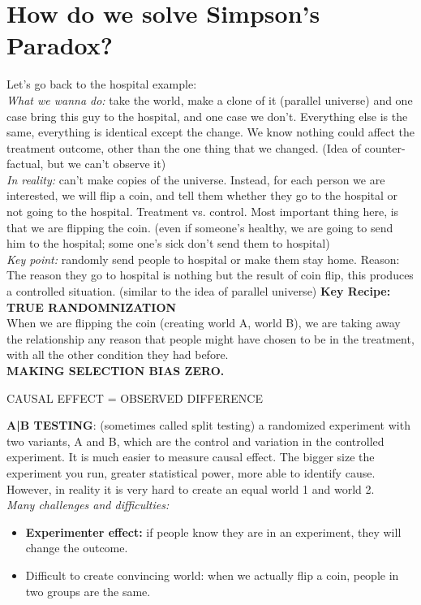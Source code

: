 \section{How do we solve Simpson's Paradox?}
Let's go back to the hospital example: \\
\textit{What we wanna do:} take the world, make a clone of it (parallel universe) and one case bring this guy to the hospital, and one case we don’t. Everything else is the same, everything is identical except the change. We know nothing could affect the treatment outcome, other than the one thing that we changed. (Idea of counter-factual, but we can’t observe it)\\
\textit{In reality:} can’t make copies of the universe. Instead, for each person we are interested, we will flip a coin, and tell them whether they go to the hospital or not going to the hospital. Treatment vs. control. Most important thing here, is that we are flipping the coin. (even if someone’s healthy, we are going to send him to the hospital; some one’s sick don’t send them to hospital)\\
\textit{Key point:} randomly send people to hospital or make them stay home. Reason: The reason they go to hospital is nothing but the result of coin flip, this produces a controlled situation. (similar to the idea of parallel universe) \textbf{Key Recipe: TRUE RANDOMNIZATION}\\
When we are flipping the coin (creating world A, world B), we are taking away the relationship any reason that people might have chosen to be in the treatment, with all the other condition they had before.\\ \textbf{MAKING SELECTION BIAS ZERO.}
\begin{center}
CAUSAL EFFECT = OBSERVED DIFFERENCE
\end{center}
\textbf{A|B TESTING}: (sometimes called split testing) a randomized experiment with two variants, A and B, which are the control and variation in the controlled experiment. It is much easier to measure causal effect. The bigger size the experiment you run, greater statistical power, more able to identify cause. However, in reality it is very hard to create an equal world 1 and world 2.\\
\textit{Many challenges and difficulties:} 
\begin{itemize}
  \item \textbf{Experimenter effect:} if people know they are in an experiment, they will change the outcome.
  \item Difficult to create convincing world: when we actually flip a coin, people in two groups are the same.
\end{itemize}

